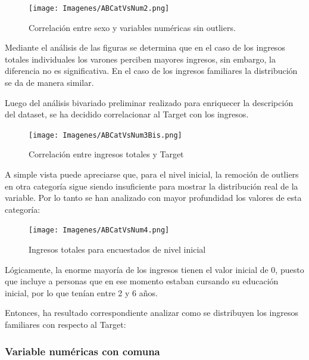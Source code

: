 \documentclass[a4paper]{article}
\begin{document}
            \begin{figure}[H]
                \centering
                \texttt{[image: Imagenes/ABCatVsNum2.png]}
                \caption{Correlación entre sexo y variables numéricas sin outliers.}
                \label{AB genre and numeric variables without outliers}
            \end{figure}
 
            Mediante el análisis de las figuras se determina que en el caso de los ingresos totales individuales los varones perciben mayores ingresos, sin embargo, la diferencia no es significativa. En el caso de los ingresos familiares la distribución se da de manera similar. 
 
 \vspace{1cm}

          Luego del análisis bivariado preliminar realizado para enriquecer la descripción del dataset, se ha decidido correlacionar al Target con los ingresos.
            \begin{figure}[H]
            \centering
                \texttt{[image: Imagenes/ABCatVsNum3Bis.png]}
                \caption{Correlación entre ingresos totales y Target}
                \label{AB Target and Total Incomes}
            \end{figure}
 
            A simple vista puede apreciarse que, para el nivel inicial, la remoción de outliers en otra categoría sigue siendo insuficiente para mostrar la distribución real de la variable. Por lo tanto se han analizado con mayor profundidad los valores de esta categoría:
 
            \begin{figure}[H]
            \centering
                \texttt{[image: Imagenes/ABCatVsNum4.png]}
                \caption{Ingresos totales para encuestados de nivel inicial}
                \label{AB Total Incomes for Initial level}
            \end{figure}
 
            Lógicamente, la enorme mayoría de los ingresos tienen el valor inicial de 0, puesto que incluye a personas que en ese momento estaban cursando su educación inicial, por lo que tenían entre 2 y 6 años.

            Entonces, ha resultado correspondiente analizar como se distribuyen los ingresos familiares con respecto al Target:
 

        \newpage
 
        \subsubsection{Variable numéricas con comuna}
\end{document}
